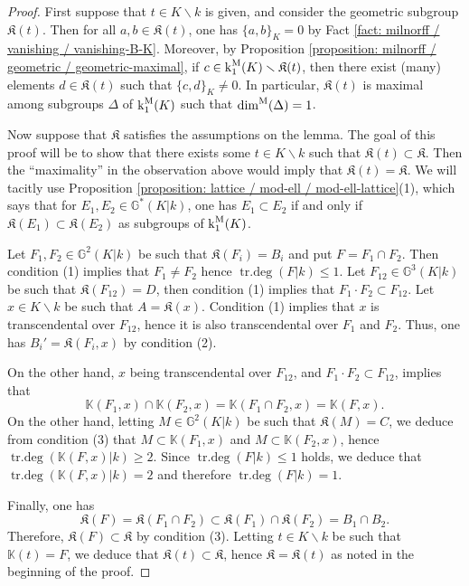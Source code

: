 \documentclass[11pt]{amsart}
\theoremstyle{definition}
\theoremstyle{remark}
\numberwithin{equation}{section}
\DeclareMathOperator{\trdeg}{tr.deg}
\newcommand{\G}{\mathbb{G}}
\newcommand{\Kbb}{\mathbb{K}}
\newcommand{\Kfrak}{\mathfrak{K}}
\renewcommand{\k}{\operatorname{k}^{\rm M}}
\newcommand{\dimm}{\dim^{\rm M}}
\begin{document}
\begin{proof}
  First suppose that $t \in K \smallsetminus k$ is given, and consider the geometric subgroup $\Kfrak(t)$.
  Then for all $a,b \in \Kfrak(t)$, one has $\{a,b\}_K = 0$ by Fact \ref{fact: milnorff / vanishing / vanishing-B-K}.
  Moreover, by Proposition \ref{proposition: milnorff / geometric / geometric-maximal}, if $c \in \k_1(K) \smallsetminus \Kfrak(t)$, then there exist (many) elements $d \in \Kfrak(t)$ such that $\{c,d\}_K \neq 0$.
  In particular, $\Kfrak(t)$ is maximal among subgroups $\Delta$ of $\k_1(K)$ such that $\dimm(\Delta) = 1$.

  Now suppose that $\Kfrak$ satisfies the assumptions on the lemma.
  The goal of this proof will be to show that there exists some $t \in K \smallsetminus k$ such that $\Kfrak(t) \subset \Kfrak$.
  Then the ``maximality'' in the observation above would imply that $\Kfrak(t) = \Kfrak$.
  We will tacitly use Proposition \ref{proposition: lattice / mod-ell / mod-ell-lattice}(1), which says that for $E_1,E_2 \in \G^*(K|k)$, one has $E_1 \subset E_2$ if and only if $\Kfrak(E_1) \subset \Kfrak(E_2)$ as subgroups of $\k_1(K)$.

  Let $F_1,F_2 \in \G^2(K|k)$ be such that $\Kfrak(F_i) = B_i$ and put $F = F_1 \cap F_2$.
  Then condition (1) implies that $F_1 \neq F_2$ hence $\trdeg(F|k) \leq 1$.
  Let $F_{12} \in \G^3(K|k)$ be such that $\Kfrak(F_{12}) = D$, then condition (1) implies that $F_1 \cdot F_2 \subset F_{12}$.
  Let $x \in K \smallsetminus k$ be such that $A = \Kfrak(x)$.
  Condition (1) implies that $x$ is transcendental over $F_{12}$, hence it is also transcendental over $F_1$ and $F_2$.
  Thus, one has $B_i' = \Kfrak(F_i,x)$ by condition (2).

  On the other hand, $x$ being transcendental over $F_{12}$, and $F_1 \cdot F_2 \subset F_{12}$, implies that 
  \[ \Kbb(F_1,x) \cap \Kbb(F_2,x) = \Kbb(F_1 \cap F_2,x) = \Kbb(F,x). \]
  On the other hand, letting $M \in \G^2(K|k)$ be such that $\Kfrak(M) = C$, we deduce from condition (3) that $M \subset \Kbb(F_1,x)$ and $M \subset \Kbb(F_2,x)$, hence $\trdeg(\Kbb(F,x)|k) \geq 2$.
  Since $\trdeg(F|k) \leq 1$ holds, we deduce that $\trdeg(\Kbb(F,x)|k) = 2$ and therefore $\trdeg(F|k) = 1$.

  Finally, one has 
  \[ \Kfrak(F) = \Kfrak(F_1 \cap F_2) \subset \Kfrak(F_1) \cap \Kfrak(F_2) = B_1 \cap B_2. \]
  Therefore, $\Kfrak(F) \subset \Kfrak$ by condition (3).
  Letting $t \in K \smallsetminus k$ be such that $\Kbb(t) = F$, we deduce that $\Kfrak(t) \subset \Kfrak$, hence $\Kfrak = \Kfrak(t)$ as noted in the beginning of the proof.
\end{proof}
\end{document}
